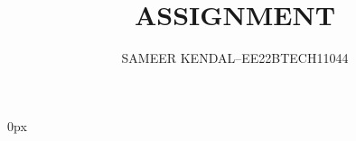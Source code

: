 \documentclass[journal,12pt,twocolumn]{IEEEtran}
\theoremstyle{remark}
\begin{document}
%
\parindent 0px



\vspace{3cm}

\title{
ASSIGNMENT
}
\author{ SAMEER KENDAL--EE22BTECH11044%
	
}	


%
%
%

% 
%



% 
\end{document}
